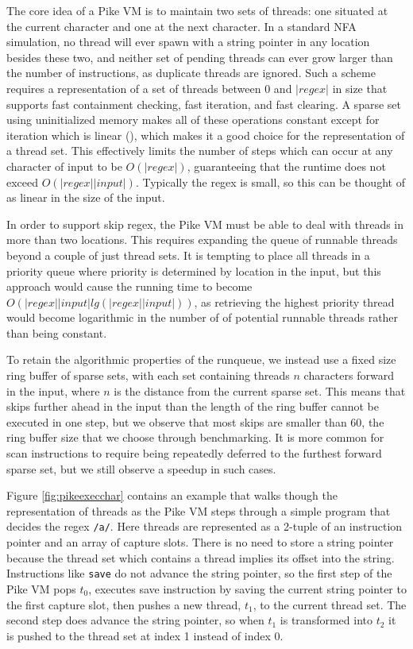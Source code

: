 The core idea of a Pike VM is to maintain two sets of threads:
one situated at the current character and one at the next character.
In a standard NFA simulation, no thread will ever spawn with
a string pointer in any location besides these two, and
neither set of pending threads can ever grow larger than
the number of instructions, as duplicate threads are ignored.
Such a scheme requires a representation of a set of threads
between $0$ and $|regex|$ in size that supports fast containment
checking, fast iteration, and fast clearing. A sparse set using
uninitialized memory makes all of these operations constant except
for iteration which is linear (\cite{Briggs1993}), which makes it
a good choice for the representation of a thread set. This
effectively limits the number of steps which can occur
at any character of input to be $O(|regex|)$, guaranteeing that
the runtime does not exceed $O(|regex||input|)$. Typically the regex
is small, so this can be thought of as linear in the size of the input.

In order to support skip regex, the Pike VM must be able to deal
with threads in more than two locations. This requires expanding
the queue of runnable threads beyond a couple of just thread sets.
It is tempting to place all threads in a priority queue where
priority is determined by location in the input,
but this approach would cause the running time to become
$O(|regex||input|lg(|regex||input|))$, as retrieving the highest
priority thread would become logarithmic in the number of
of potential runnable threads rather than being constant.

To retain the algorithmic properties of the runqueue,
we instead use a fixed size ring buffer of sparse sets, with
each set containing threads $n$ characters forward in the input,
where $n$ is the distance from the current sparse set. This means
that skips further ahead in the input than the length of the ring
buffer cannot be executed in one step, but we observe that most
skips are smaller than $60$, the ring buffer size that we choose
through benchmarking. It is more common for scan instructions to
require being repeatedly deferred to the furthest forward sparse set,
but we still observe a speedup in such cases.

Figure \ref{fig:pikeexecchar} contains an example that walks though
the representation of threads as the Pike VM steps through a simple
program that decides the regex \verb'/a/'. Here threads are represented as
a 2-tuple of an instruction pointer and an array of capture slots.
There is no need to store a string pointer because the thread set
which contains a thread implies its offset into the string.
Instructions like \verb'save' do not advance the string pointer,
so the first step of the Pike VM pops $t_0$, executes save instruction
by saving the current string pointer to the first capture slot, then
pushes a new thread, $t_1$, to the current thread set. The second step
does advance the string pointer, so when $t_1$ is transformed into $t_2$
it is pushed to the thread set at index 1 instead of index 0.

